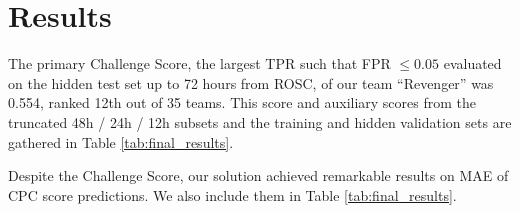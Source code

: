 \section{Results}
\label{sec:results}



% 


The primary Challenge Score, the largest TPR such that FPR $\le 0.05$ evaluated on the hidden test set up to 72 hours from ROSC, of our team ``Revenger'' was 0.554, ranked 12th out of 35 teams. This score and auxiliary scores from the truncated 48h / 24h / 12h subsets and the training and hidden validation sets are gathered in Table \ref{tab:final_results}.



 Despite the Challenge Score, our solution achieved remarkable results on MAE of CPC score predictions. We also include them in Table \ref{tab:final_results}.
